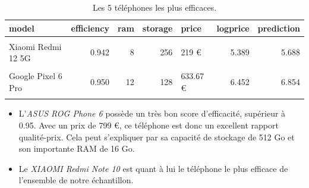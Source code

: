 \documentclass[
  12pt,
]{report}
\begin{document}
\begin{table}[!h]
\centering
\caption{\label{tab:best}Les 5 téléphones les plus efficaces.}
\centering
\begin{tabular}[t]{lrrrlrr}
\toprule
\textbf{model} & \textbf{efficiency} & \textbf{ram} & \textbf{storage} & \textbf{price} & \textbf{logprice} & \textbf{prediction}\\
\midrule
\cellcolor{gray!10}{OPPO Find X3 Lite} & \cellcolor{gray!10}{0.941} & \cellcolor{gray!10}{8} & \cellcolor{gray!10}{128} & \cellcolor{gray!10}{259.06 €} & \cellcolor{gray!10}{5.557} & \cellcolor{gray!10}{5.850}\\
Xiaomi Redmi 12 5G & 0.942 & 8 & 256 & 219 € & 5.389 & 5.688\\
\cellcolor{gray!10}{ASUS ROG Phone 6} & \cellcolor{gray!10}{0.949} & \cellcolor{gray!10}{16} & \cellcolor{gray!10}{512} & \cellcolor{gray!10}{799 €} & \cellcolor{gray!10}{6.683} & \cellcolor{gray!10}{7.069}\\
Google Pixel 6 Pro & 0.950 & 12 & 128 & 633.67 € & 6.452 & 6.854\\
\cellcolor{gray!10}{XIAOMI Redmi Note 10} & \cellcolor{gray!10}{0.956} & \cellcolor{gray!10}{4} & \cellcolor{gray!10}{64} & \cellcolor{gray!10}{159 €} & \cellcolor{gray!10}{5.069} & \cellcolor{gray!10}{5.566}\\
\bottomrule
\end{tabular}
\end{table}

\begin{itemize}
\item
  L'\emph{ASUS ROG Phone 6} possède un très bon score d'efficacité,
  supérieur à 0.95. Avec un prix de 799 €, ce téléphone est donc un
  excellent rapport qualité-prix. Cela peut s'expliquer par sa capacité
  de stockage de 512 Go et son importante RAM de 16 Go.
\item
  Le \emph{XIAOMI Redmi Note 10} est quant à lui le téléphone le plus
  efficace de l'ensemble de notre échantillon.
\end{itemize}
\end{document}
